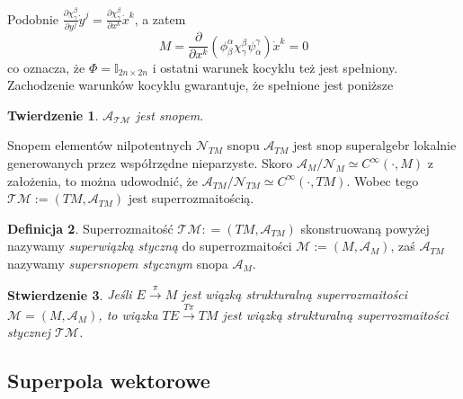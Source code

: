 \documentclass[11pt,a4paper]{report}
\newtheorem{theorem}{Twierdzenie}[section]
\newtheorem{proposition}[theorem]{Stwierdzenie}
\theoremstyle{definition}
\newtheorem{definition}[theorem]{Definicja}
\newcommand{\I}{\mathbb{I}}
\begin{document}
Podobnie $\frac{\partial \chi ^\beta _\gamma}{\partial y^j}\dot y^j = \frac{\partial \chi ^\beta _\gamma}{\partial x^k}\dot x^k$, a zatem 
\begin{equation*}
	M = \frac{\partial}{\partial x^k} \left( \phi ^\alpha _\beta \chi ^\beta _\gamma \psi ^\gamma _\alpha \right) \dot x^k = 0
\end{equation*}
co oznacza, że $\Phi = \I_{2n\times 2n}$ i ostatni warunek kocyklu też jest spełniony. Zachodzenie warunków kocyklu gwarantuje, że spełnione jest poniższe
		      			
\begin{theorem}
	\label{thm:supertangent_sheaf01}
	$\mathcal{A}_{\mathcal{TM}}$ jest snopem.
\end{theorem}
		      			
Snopem elementów nilpotentnych $\mathcal{N}_{TM}$ snopu $\mathcal{A}_{TM}$ jest snop superalgebr lokalnie generowanych przez współrzędne nieparzyste. Skoro $\mathcal{A}_{M}/\mathcal{N}_M\simeq C^\infty(\cdot,M)$ z założenia, to można udowodnić, że $\mathcal{A}_{TM} / \mathcal{N}_{TM} \simeq C^\infty(\cdot,{TM})$. Wobec tego $\mathcal{T} \mathcal{M} := (TM, \mathcal{A}_{TM})$ jest superrozmaitością.
		      			
\begin{definition}
	Superrozmaitość $\mathcal{T} \mathcal{M}: = (TM, \mathcal{A}_{TM})$ skonstruowaną powyżej nazywamy \textit{superwiązką styczną} do superrozmaitości $\mathcal{M} := (M, \mathcal{A}_M)$, zaś $\mathcal{A}_{TM}$ nazywamy \textit{supersnopem stycznym} snopa $\mathcal{A}_{M}$.
\end{definition}
		      			
\begin{proposition}
	Jeśli $E \stackrel{\pi}{\rightarrow} M$ jest wiązką strukturalną superrozmaitości $\mathcal{M} = (M, \mathcal{A}_M)$, to wiązka $TE \stackrel{T\pi}{\longrightarrow} TM$ jest wiązką strukturalną superrozmaitości stycznej $\mathcal{T} \mathcal{M}$.
\end{proposition}
		      			
\subsection{Superpola wektorowe}
		      			
\end{document}
